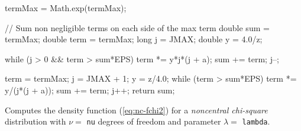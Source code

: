 \begin{code}
\begin{hide}
{      termMax = Math.exp(termMax);

      // Sum non negligible terms on each side of the max term
      double sum = termMax;
      double term = termMax;
      long j = JMAX;
      double y = 4.0/z;

      while (j > 0 && term > sum*EPS) {
         term *= y*j*(j + a);
         sum += term;
         j--;
      }

      term = termMax;
      j = JMAX + 1;
      y = z/4.0;
      while (term > sum*EPS) {
         term *= y/(j*(j + a));
         sum += term;
         j++;
      }
      return sum;
   }\end{hide}
\end{code}
\begin{tabb} Computes the density function (\ref{eq:nc-fchi2}) for a
 {\em noncentral chi-square\/} distribution with $\nu = $ \texttt{nu} degrees
 of freedom and parameter  $\lambda = $ \texttt{lambda}.
\end{tabb}
